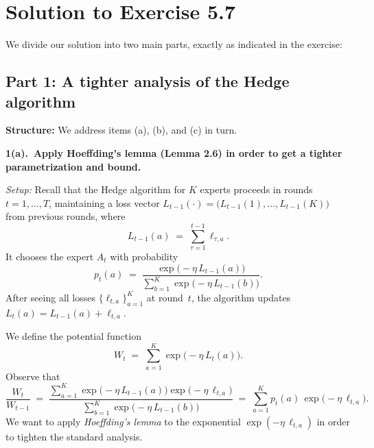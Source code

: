 \section*{Solution to Exercise 5.7}

We divide our solution into two main parts, exactly as indicated in the exercise:

\subsection*{Part 1: A tighter analysis of the Hedge algorithm}

\noindent
\textbf{Structure:} We address items (a), (b), and (c) in turn.

\bigskip

\noindent
\textbf{1(a).~Apply Hoeffding's lemma (Lemma 2.6) in order to get a tighter parametrization and bound.}

\noindent
\emph{Setup:} Recall that the Hedge algorithm for $K$ experts proceeds in rounds $t=1,\dots,T$, maintaining a loss vector $L_{t-1}(\cdot) = \bigl(L_{t-1}(1),\dots,L_{t-1}(K)\bigr)$ from previous rounds, where
\[
L_{t-1}(a) \;=\; \sum_{\tau=1}^{t-1}\ell_{\tau,a}.
\]
It chooses the expert $A_t$ with probability
\[
p_t(a) \;=\;
\frac{\exp\bigl(-\eta\,L_{t-1}(a)\bigr)}{\sum_{b=1}^K \exp\bigl(-\eta\,L_{t-1}(b)\bigr)}.
\]
After seeing all losses $\{\ell_{t,a}\}_{a=1}^K$ at round~$t$, the algorithm updates $L_t(a)=L_{t-1}(a)+\ell_{t,a}$.

We define the potential function
\[
W_t \;=\; \sum_{a=1}^K \exp\bigl(-\eta\,L_t(a)\bigr).
\]
Observe that
\[
\frac{W_t}{W_{t-1}}
\;=\;\frac{\sum_{a=1}^K \exp\bigl(-\eta\,L_{t-1}(a)\bigr)\exp\bigl(-\eta\,\ell_{t,a}\bigr)}
{\sum_{b=1}^K \exp\bigl(-\eta\,L_{t-1}(b)\bigr)}
\;=\;\sum_{a=1}^K p_t(a)\,\exp\bigl(-\eta\,\ell_{t,a}\bigr).
\]
We want to apply \emph{Hoeffding's lemma} to the exponential $\exp(-\eta\,\ell_{t,a})$ in order to tighten the standard analysis. 

